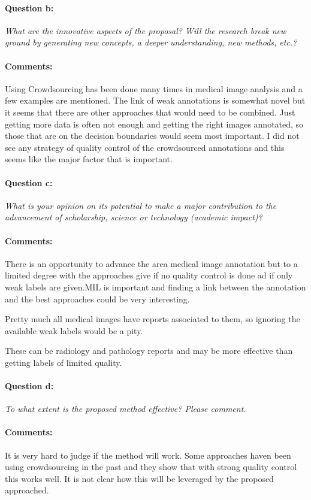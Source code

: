 \documentclass[serif, twocolumn, numeric, rga]{jote-article}
\begin{document}
\paragraph{Question b:}
\textit{What are the innovative aspects of the proposal? Will the research break new ground by generating new concepts, a deeper understanding, new methods, etc.?}
\paragraph{Comments:}
Using Crowdsourcing has been done many times in medical image analysis and a few examples are mentioned. The link of weak annotations is somewhat novel but it seems that there are other approaches that would need to be combined. Just getting more data is often not enough and getting the right images annotated, so those that are on the decision boundaries would seem most important. I did not see any strategy of quality control of the crowdsourced annotations and this seems like the major factor that is important.
\paragraph{Question c:}
\textit{What is your opinion on its potential to make a major contribution to the advancement of scholarship, science or technology (academic impact)?}
\paragraph{Comments:}
There is an opportunity to advance the area medical image annotation but to a limited degree with the approaches give if no quality control is done ad if only weak labels are given.MIL is important and finding a link between the annotation and the best approaches could be very interesting.

Pretty much all medical images have reports associated to them, so ignoring the available weak labels would be a pity.

These can be radiology and pathology reports and may be more effective than getting labels of limited quality.
\paragraph{Question d:}
\textit{To what extent is the proposed method effective? Please comment.}
\paragraph{Comments:}
It is very hard to judge if the method will work. Some approaches haven been using crowdsourcing in the past and they show that with strong quality control this works well. It is not clear how this will be leveraged by the proposed approached.
\end{document}
